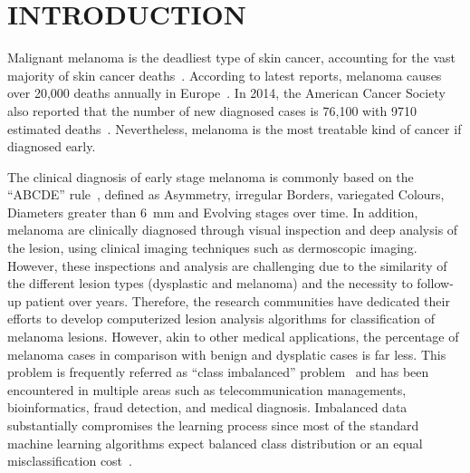 \graphicspath{ {./content/intro/figures/} }

\section{\uppercase{Introduction}}
\label{sec:intro}  %

\noindent Malignant melanoma is the deadliest type of skin cancer, accounting for the vast majority of skin cancer deaths~\cite{CancerFactsFigures2014}. 
According to latest reports, melanoma causes over 20,000 deaths annually in Europe~\cite{forsea2012melanoma}. 
In 2014, the American Cancer Society also reported that the number of new diagnosed cases is 76,100 with 9710 estimated deaths~\cite{CancerFactsFigures2014}. 
Nevertheless, melanoma is the most treatable kind of cancer if diagnosed early. 

The clinical diagnosis of early stage melanoma is commonly based on the ``ABCDE'' rule~\cite{abbasi2004early}, defined as Asymmetry, irregular Borders, variegated Colours, Diameters greater than \SI{6}{\milli \metre} and Evolving stages over time. 
In addition, melanoma are clinically diagnosed through visual inspection and deep analysis of the lesion, using clinical imaging techniques such as dermoscopic imaging. 
However, these inspections and analysis are challenging due to the similarity of the different lesion types (dysplastic and melanoma) and the necessity to follow-up patient over years.
Therefore, the research communities have dedicated their efforts to develop computerized lesion analysis algorithms for classification of melanoma lesions. 
However, akin to other medical applications, the percentage of melanoma cases in comparison with benign and dysplatic cases is far less. 
This problem is frequently referred as ``class imbalanced'' problem~\cite{prati2009data} and has been encountered in multiple areas such as telecommunication managements, bioinformatics, fraud detection, and medical diagnosis. 
Imbalanced data substantially compromises the learning process since most of the standard machine learning algorithms expect balanced class distribution or an equal misclassification cost~\cite{he2009learning}.


